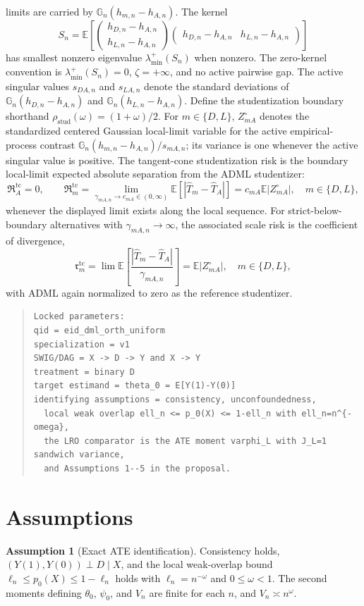 \documentclass[11pt]{article}
\newcommand{\E}{\mathbb{E}}
\theoremstyle{definition}
\newtheorem{assumption}{Assumption}
\theoremstyle{plain}
\theoremstyle{remark}
\begin{document}
limits are carried by \(\mathbb G_n(h_{m,n}-h_{A,n})\).  The kernel
\[
  S_n=\E\left[
     \begin{pmatrix}h_{D,n}-h_{A,n}\\ h_{L,n}-h_{A,n}\end{pmatrix}
     \begin{pmatrix}h_{D,n}-h_{A,n}& h_{L,n}-h_{A,n}\end{pmatrix}
  \right]
\]
has smallest nonzero eigenvalue \(\lambda_{\min}^+(S_n)\) when nonzero.  The
zero-kernel convention is \(\lambda_{\min}^+(S_n)=0\), \(\zeta=+\infty\), and
no active pairwise gap.  The active singular values \(s_{DA,n}\) and
\(s_{LA,n}\) denote the standard deviations of
\(\mathbb G_n(h_{D,n}-h_{A,n})\) and \(\mathbb G_n(h_{L,n}-h_{A,n})\).
Define the studentization boundary shorthand
\(\rho_{\mathrm{stud}}(\omega)=(1+\omega)/2\).  For
\(m\in\{D,L\}\), \(Z_{mA}^\circ\) denotes the standardized centered Gaussian
local-limit variable for the active empirical-process contrast
\(\mathbb G_n(h_{m,n}-h_{A,n})/s_{mA,n}\); its variance is one whenever the
active singular value is positive.  The tangent-cone studentization risk is
the boundary local-limit expected absolute separation from the ADML
studentizer:
\[
  \mathfrak R_A^{\mathrm{tc}}=0,\qquad
  \mathfrak R_m^{\mathrm{tc}}
  =
  \lim_{\gamma_{mA,n}\to c_{mA}\in(0,\infty)}
  \E\!\left[|\widehat T_m-\widehat T_A|\right]
  =
  c_{mA}\E|Z_{mA}^\circ|,\quad m\in\{D,L\},
\]
whenever the displayed limit exists along the local sequence.  For
strict-below-boundary alternatives with \(\gamma_{mA,n}\to\infty\), the
associated scale risk is the coefficient of divergence,
\[
  \mathfrak r_m^{\mathrm{tc}}
  =
  \lim \E\!\left[
    \frac{|\widehat T_m-\widehat T_A|}{\gamma_{mA,n}}
  \right]
  =
  \E|Z_{mA}^\circ|,\quad m\in\{D,L\},
\]
with ADML again normalized to zero as the reference studentizer.

\begin{quote}
\begin{verbatim}
Locked parameters:
qid = eid_dml_orth_uniform
specialization = v1
SWIG/DAG = X -> D -> Y and X -> Y
treatment = binary D
target estimand = theta_0 = E[Y(1)-Y(0)]
identifying assumptions = consistency, unconfoundedness,
  local weak overlap ell_n <= p_0(X) <= 1-ell_n with ell_n=n^{-omega},
  the LRO comparator is the ATE moment varphi_L with J_L=1 sandwich variance,
  and Assumptions 1--5 in the proposal.
\end{verbatim}
\end{quote}

\section{Assumptions}
\begin{assumption}[Exact ATE identification]\label{ass:eif}
Consistency holds, \((Y(1),Y(0))\perp D\mid X\), and the local weak-overlap
bound \(\ell_n\le p_0(X)\le 1-\ell_n\) holds with
\(\ell_n=n^{-\omega}\) and \(0\le\omega<1\).  The second moments defining
\(\theta_0\), \(\psi_0\), and \(V_n\) are finite for each \(n\), and
\(V_n\asymp n^\omega\).
\end{assumption}
\end{document}
